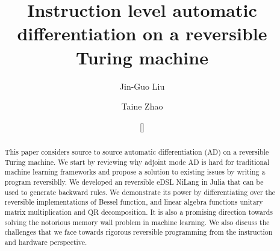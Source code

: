 \documentclass[aps,twocolumn,longbibliography,english,superscriptaddress]{revtex4-1}
\newcommand{\<}{\langle}
\renewcommand{\>}{\rangle}
\newcommand{\blue}[1]{[{\bf  \color{blue}{JG: #1}}]}
\theoremstyle{definition}\newtheorem{definition}{\textit{Definition}}
\begin{document}
\title{Instruction level automatic differentiation on a reversible Turing machine}


\author{Jin-Guo Liu}

\author{Taine Zhao}

\author{\blue{MLS's name here}}

\begin{abstract}
    This paper considers source to source automatic differentiation (AD) on a reversible Turing machine. We start by reviewing why adjoint mode AD is hard for traditional machine learning frameworks and propose a solution to existing issues by writing a program reversiblly. We developed an reversible eDSL NiLang in Julia that can be used to generate backward rules. We demonstrate its power by differentiating over the reversible implementations of Bessel function, and linear algebra functions unitary matrix multiplication and QR decomposition. It is also a promising direction towards solving the notorious memory wall problem in machine learning. We also discuss the challenges that we face towards rigorous reversible programming from the instruction and hardware perspective.
\end{abstract}


\maketitle

\end{document}
